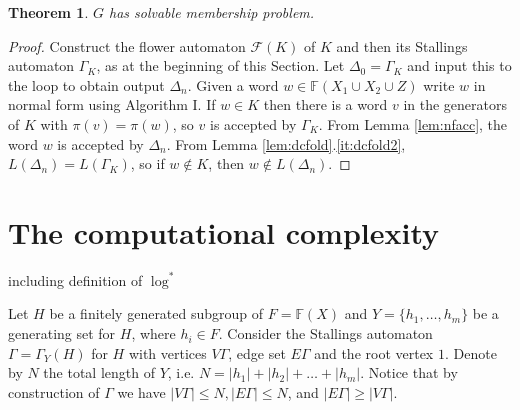 \documentclass[a4paper,12pt]{article}
\newcommand{\G}{\Gamma }
\newcommand{\D}{\Delta }
\renewcommand{\L}{\Lambda }
\renewcommand{\S}{\Sigma }
\newcommand{\cA}{{\cal{A}}}
\newcommand{\cF}{{\cal{F}}}
\newtheorem{theorem}{Theorem}[section]
\numberwithin{equation}{section}
\numberwithin{figure}{section}
\newcommand{\FF}{\ensuremath{\mathbb{F}}}
\renewcommand{\cF}{\mathcal{F}}
\begin{document}

\begin{theorem}
$G$ has solvable membership problem.
\end{theorem}
\begin{proof}
Construct the flower automaton $\cF(K)$ of $K$ and then
its Stallings automaton $\G_K$,  as at the beginning of this Section. %
Let $\D_0=\G_K$ and input this to the loop to obtain output $\D_n$.
Given a word $w\in \FF(X_1\cup X_2\cup Z)$ write $w$ in normal form
using Algorithm I. If $w\in K$ then there is a word $v$ in the generators
 of $K$ with $\pi(v)=\pi(w)$, so $v$ is accepted by $\G_K$. From
Lemma \ref{lem:nfacc}, the word $w$ is accepted by $\D_n$. From
Lemma \ref{lem:dcfold}.\ref{it:dcfold2}, $L(\D_n)=L(\G_K)$,
so if $w\notin K$, then
$w\notin L(\D_n)$.
\end{proof}

\section{The computational complexity}\label{sec:TC}

{}
{\ajd including definition of $\log^*$}


Let $H$ be a finitely generated subgroup of $F=\FF(X)$ and
$Y=\{h_1,\ldots ,h_m\}$ be a generating set for $H$, where $h_i\in
F$. Consider the Stallings automaton $\G = \G_Y(H)$ for $H$ with
vertices $V\G$, edge set $E\G$ and the root vertex $1$. Denote by
$N$ the total length of $Y$, i.e. $N = |h_1| + |h_2| + \ldots +
|h_m|$. Notice that by construction of $\G$ we have $|V\G| \le N,
|E\G| \le N$, and $|E \G| \ge |V \G|$.
\end{document}
